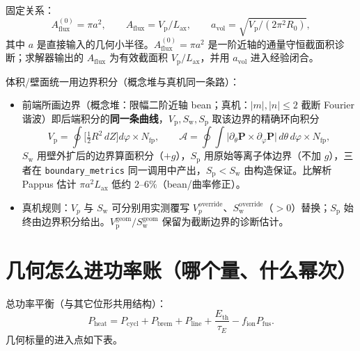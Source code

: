 \documentclass[UTF8,11pt]{ctexart}
\newcommand{\Vp}{V_\mathrm{p}}
\newcommand{\Sw}{S_\mathrm{w}}
\newcommand{\Sp}{S_\mathrm{p}}
\newcommand{\Aflux}{A_\mathrm{flux}}
\newcommand{\Lax}{L_\mathrm{ax}}
\newcommand{\nfp}{N_\mathrm{fp}}
\newcommand{\Pfus}{P_\mathrm{fus}}
\newcommand{\Pbrem}{P_\mathrm{brem}}
\newcommand{\Pcycl}{P_\mathrm{cycl}}
\newcommand{\Pheat}{P_\mathrm{heat}}
\newcommand{\Eth}{E_\mathrm{th}}
\begin{document}
固定关系：
\begin{equation}
\Aflux^{(0)} = \pi a^2,\qquad \Aflux = \Vp/\Lax,\qquad a_\mathrm{vol}=\sqrt{\Vp/(2\pi^2R_0)} ,
\end{equation}
其中 $a$ 是直接输入的几何小半径。$\Aflux^{(0)}=\pi a^2$ 是一阶近轴的通量守恒截面积诊断；求解器输出的 $\Aflux$ 为有效截面积 $\Vp/\Lax$，并用 $a_\mathrm{vol}$ 进入经验闭合。

体积/壁面统一用边界积分（概念堆与真机同一条路）：
\begin{itemize}
\item 前端所画边界（概念堆：限幅二阶近轴 bean；真机：$|m|,|n|\le2$ 截断 Fourier 谐波）即后端积分的\textbf{同一条曲线}，$\Vp,\Sw,\Sp$ 取该边界的精确环向积分
  \begin{equation}
    \Vp=\oint\!\Big[\tfrac12 R^2\,dZ\Big]d\varphi\times\nfp,\qquad
    \mathcal{A} = \oint\!\!\int\big|\partial_\theta \bm P\times\partial_\varphi \bm P\big|\,d\theta\,d\varphi\times\nfp,
  \end{equation}
  $\Sw$ 用壁外扩后的边界算面积分（$+g$），$\Sp$ 用原始等离子体边界（不加 $g$），三者在 \texttt{boundary\_metrics} 同一调用中产出，$\Sp<\Sw$ 由构造保证。比解析 Pappus 估计 $\pi a^2\Lax$ 低约 $2$--$6\%$（bean/曲率修正）。
\item 真机规则：$V_p$ 与 $\Sw$ 可分别用实测覆写 $V_p^\mathrm{override}$、$\Sw^\mathrm{override}$（$>0$）替换；$\Sp$ 始终由边界积分给出。$\Vp^{\mathrm{geom}}/\Sw^{\mathrm{geom}}$ 保留为截断边界的诊断估计。
\end{itemize}

\section{几何怎么进功率账（哪个量、什么幂次）}\label{sec:power}

总功率平衡（与其它位形共用结构）：
\begin{equation}
\Pheat = \Pcycl + \Pbrem + P_\mathrm{line} + \frac{\Eth}{\tau_E} - f_\mathrm{ion}\Pfus .
\end{equation}
几何标量的进入点如下表。
\end{document}
